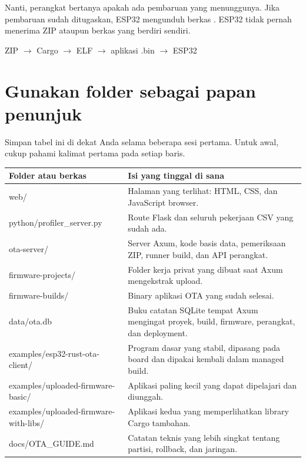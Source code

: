Nanti, perangkat bertanya apakah ada pembaruan yang menunggunya. Jika pembaruan sudah ditugaskan, ESP32 mengunduh berkas . ESP32 tidak pernah menerima ZIP ataupun berkas  yang berdiri sendiri.

\begin{center}
\ttfamily ZIP $\rightarrow$ Cargo $\rightarrow$ ELF $\rightarrow$ aplikasi .bin $\rightarrow$ ESP32
\end{center}

\section{Gunakan folder sebagai papan penunjuk}

Simpan tabel ini di dekat Anda selama beberapa sesi pertama. Untuk awal, cukup pahami kalimat pertama pada setiap baris.

\begin{longtable}{>{\ttfamily\footnotesize\raggedright\arraybackslash}p{}p{}}
\toprule
Folder atau berkas & Isi yang tinggal di sana\\
\midrule
\endhead
web/ & Halaman yang terlihat: HTML, CSS, dan JavaScript browser.\\
python/profiler\_server.py & Route Flask dan seluruh pekerjaan CSV yang sudah ada.\\
ota-server/ & Server Axum, kode basis data, pemeriksaan ZIP, runner build, dan API perangkat.\\
firmware-projects/ & Folder kerja privat yang dibuat saat Axum mengekstrak upload.\\
firmware-builds/ & Binary aplikasi OTA yang sudah selesai.\\
data/ota.db & Buku catatan SQLite tempat Axum mengingat proyek, build, firmware, perangkat, dan deployment.\\
examples/esp32-rust-ota-client/ & Program dasar yang stabil, dipasang pada board dan dipakai kembali dalam managed build.\\
examples/uploaded-firmware-basic/ & Aplikasi paling kecil yang dapat dipelajari dan diunggah.\\
examples/uploaded-firmware-with-libs/ & Aplikasi kedua yang memperlihatkan library Cargo tambahan.\\
docs/OTA\_GUIDE.md & Catatan teknis yang lebih singkat tentang partisi, rollback, dan jaringan.\\
\bottomrule
\end{longtable}

